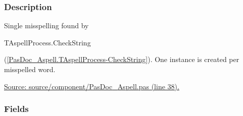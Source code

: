 \documentclass{report}
\begin{document}
\subsubsection*{\large{\textbf{Description}}\normalsize\hspace{1ex}\hfill}
Single misspelling found by \begin{ttfamily}TAspellProcess.CheckString\end{ttfamily}(\ref{PasDoc_Aspell.TAspellProcess-CheckString}). One instance is created per misspelled word.\par
\href{https://github.com/pasdoc/pasdoc/blob/master/source/component/PasDoc_Aspell.pas#L38}{Source: source/component/PasDoc{\_}Aspell.pas (line 38).}\subsubsection*{\large{\textbf{Fields}}\normalsize\hspace{1ex}\hfill}
\end{document}
